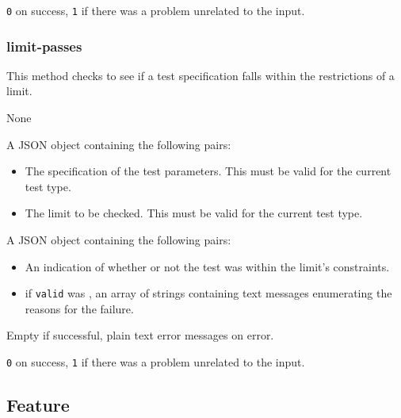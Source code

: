 \documentclass[10pt,titlepage]{article}
\begin{document}
 {\tt 0} on success, {\tt 1} if there was a
problem unrelated to the input.



\subsubsection{limit-passes}

This method checks to see if a test specification falls within the
restrictions of a limit.

 None

 A JSON object containing the following
pairs:

\begin{itemize}
\item {} The specification of the test parameters.
This must be valid for the current test type.

\item {} The limit to be checked.  This must be
valid for the current test type.

\end{itemize}


 A JSON object containing the following pairs:

\begin{itemize}
\item {} An indication of whether or not the
  test was within the limit's constraints.

\item {} if {\tt valid} was \false, an array of
  strings containing text messages enumerating the reasons for the
  failure.
\end{itemize}

 Empty if successful, plain text error
messages on error.

 {\tt 0} on success, {\tt 1} if there was a
problem unrelated to the input.



%
%
\subsection{Feature}


\end{document}
